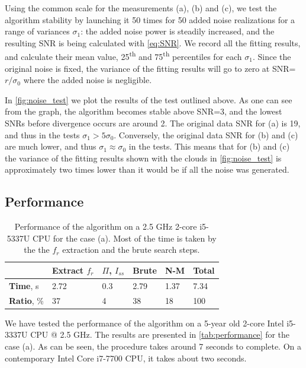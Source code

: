 \documentclass[%
 aip,
 draft,
 amsmath,amssymb,
 reprint,%
]{revtex4-1}
\begin{document}
Using the common scale for the measurements (a), (b) and (c), we test the algorithm stability by launching it 50 times for 50 added noise realizations for a range of variances $\sigma_1$: the added noise power is steadily increased, and the resulting SNR is being calculated with \eqref{eq:SNR}. We record all the fitting results, and calculate their mean value, 25\textsuperscript{th} and 75\textsuperscript{th} percentiles for each $\sigma_1$.  Since the original noise is fixed, the variance of the fitting results will go to zero at SNR=$ r/\sigma_0 $ where the added noise is negligible. 

In \autoref{fig:noise_test} we plot the results of the test outlined above. As one can see from the graph, the algorithm becomes stable above SNR=3, and the lowest SNRs before divergence occurs are around 2. The original data SNR for (a) is 19, and thus in the tests $\sigma_1 > 5\sigma_0$. Conversely, the original data SNR for (b) and (c) are much lower, and thus $\sigma_1 \approx \sigma_0$ in the tests. This means that for (b) and (c) the variance of the fitting results shown with the clouds in \autoref{fig:noise_test} is approximately two times lower than it would be if all the noise was generated.



\subsection{Performance}


\begin{table}[b]
	\begin{ruledtabular}
		\begin{tabular}{llllll}
			&Extract $f_r$& $\Pi$, $I_{ss}$ & Brute &N-M &
			\textbf{Total}\\\hline
			\textbf{Time}, s& 2.72& 0.3&2.79&1.37&7.34\\
			\textbf{Ratio}, \% & 37 &4 &38 &18 &100
		\end{tabular}
	\end{ruledtabular}
	\caption{Performance of the algorithm on a 2.5 GHz 2-core i5-5337U CPU for the case (a). Most of the time is taken by the the $f_r$ extraction and the brute search steps.}
	\label{tab:performance}
\end{table}

We have tested the performance of the algorithm on a 5-year old 2-core Intel i5-3337U CPU @ 2.5 GHz. The results are presented in \autoref{tab:performance} for the case (a).  As can be seen, the procedure takes around 7 seconds to complete. On a contemporary Intel Core i7-7700 CPU, it takes about two seconds. 
\end{document}
